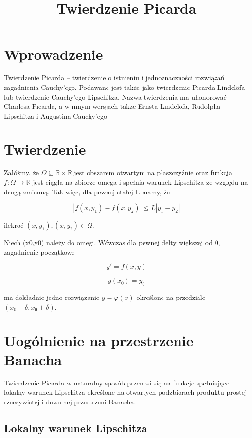 \documentclass{article}
\begin{document}
\title{Twierdzenie Picarda}
\maketitle

\section*{Wprowadzenie}
Twierdzenie Picarda – twierdzenie o istnieniu i jednoznaczności rozwiązań zagadnienia Cauchy’ego. Podawane jest także jako twierdzenie Picarda-Lindelöfa lub twierdzenie Cauchy’ego-Lipschitza. Nazwa twierdzenia ma uhonorować Charlesa Picarda, a w innym wersjach także Ernsta Lindelöfa, Rudolpha Lipschitza i Augustina Cauchy’ego.  

\section*{Twierdzenie}
Załóżmy, że  $\Omega \subseteq {\mathbb {R} }\times {\mathbb {R} }$ jest obszarem otwartym na płaszczyźnie oraz funkcja \(f\colon \Omega \to {\mathbb {R} }\) jest ciągła na zbiorze omega i spełnia warunek Lipschitza ze względu na drugą zmienną. Tak więc, dla pewnej stałej L mamy, że 

\begin{displaymath}
	|f(x,y_{1})-f(x,y_{2})|\leq L|y_{1}-y_{2}|
\end{displaymath}

ilekroć $(x,y_{1}),(x,y_{2})\in \Omega$.

Niech (x0,y0) należy do omegi. Wówczas dla pewnej delty większej od 0, zagadnienie początkowe

\begin{equation*}
	y'=f(x,y)
\end{equation*}

\[y(x_{0})=y_{0}\]

ma dokładnie jedno rozwiązanie $y=\varphi (x)$ określone na przedziale \((x_{0}-\delta ,x_{0}+\delta )\).

\section*{Uogólnienie na przestrzenie Banacha}
Twierdzenie Picarda w naturalny sposób przenosi się na funkcje spełniające lokalny warunek Lipschitza określone na otwartych podzbiorach produktu prostej rzeczywistej i dowolnej przestrzeni Banacha. 

\subsection*{Lokalny warunek Lipschitza}
\end{document}

